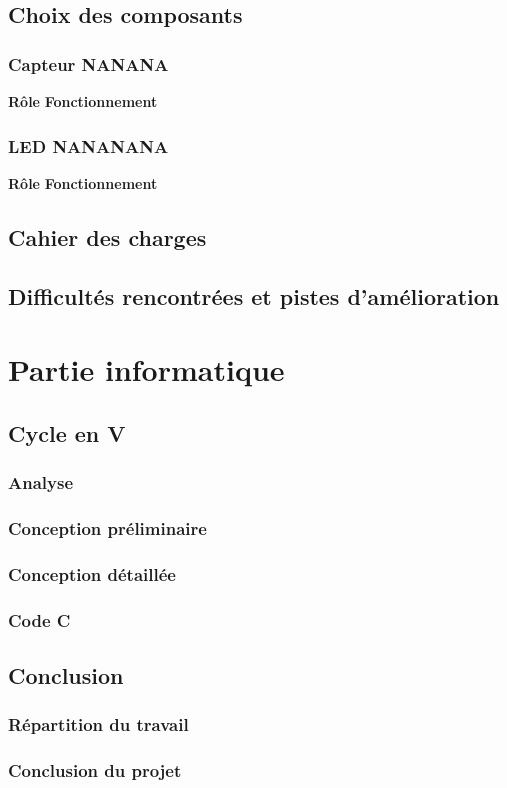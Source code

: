 \documentclass[11pt,a4paper]{article}
\begin{document}
\subsection{Choix des composants}
\subsubsection{Capteur NANANA}
\textbf{Rôle}
\textbf{Fonctionnement}
\subsubsection{LED NANANANA}
\textbf{Rôle}
\textbf{Fonctionnement}

\subsection{Cahier des charges}

\subsection{Difficultés rencontrées et pistes d'amélioration}


\section{Partie informatique}

\subsection{Cycle en V}
\subsubsection{Analyse}
\subsubsection{Conception préliminaire}
\subsubsection{Conception détaillée}
\subsubsection{Code C}

\subsection{Conclusion}
\subsubsection{Répartition du travail}
\subsubsection{Conclusion du projet}
\end{document}
